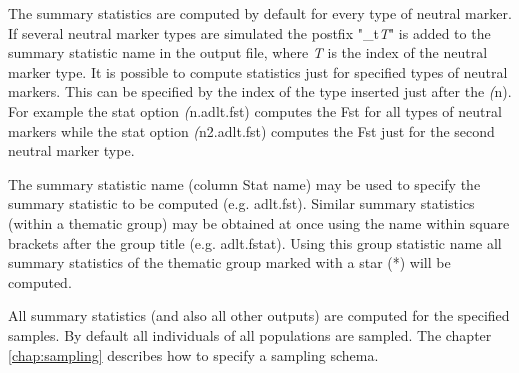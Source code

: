 \documentclass[letterpaper,12pt,oneside]{book}
\begin{document}
The summary statistics are computed by default for every type of neutral marker. If several neutral marker types are simulated the postfix "\_t\textit{T}" is added to the summary statistic name in the output file, where \textit{T} is the index of the neutral marker type. It is possible to compute statistics just for specified types of neutral markers. This can be specified by the index of the type inserted just after the \textit(n). For example the stat option \textit(n.adlt.fst) computes the Fst for all types of neutral markers while the stat option \textit(n2.adlt.fst) computes the Fst just for the second neutral marker type. 

The summary statistic name (column \textsf{Stat name}) may be used to specify the summary statistic to be computed (e.g. \textsf{adlt.fst}). Similar summary statistics (within a thematic group) may be obtained at once using the name within square brackets after the group title (e.g. \textsf{adlt.fstat}). Using this group statistic name all summary statistics of the thematic group marked with a star (*) will be computed. 

All summary statistics (and also all other outputs) are computed for the specified samples. By default all individuals of all populations are sampled. The chapter \ref{chap:sampling} describes how to specify a sampling schema.
\end{document}
